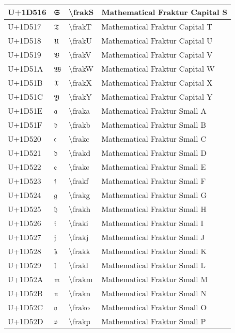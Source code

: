 \begin{table}[h]
\begin{tabulary}{\linewidth}{|L|L|L|L|}
\hline
U+1D516 & 𝔖 & {\textbackslash}frakS & Mathematical Fraktur Capital S \\
\hline
U+1D517 & 𝔗 & {\textbackslash}frakT & Mathematical Fraktur Capital T \\
\hline
U+1D518 & 𝔘 & {\textbackslash}frakU & Mathematical Fraktur Capital U \\
\hline
U+1D519 & 𝔙 & {\textbackslash}frakV & Mathematical Fraktur Capital V \\
\hline
U+1D51A & 𝔚 & {\textbackslash}frakW & Mathematical Fraktur Capital W \\
\hline
U+1D51B & 𝔛 & {\textbackslash}frakX & Mathematical Fraktur Capital X \\
\hline
U+1D51C & 𝔜 & {\textbackslash}frakY & Mathematical Fraktur Capital Y \\
\hline
U+1D51E & 𝔞 & {\textbackslash}fraka & Mathematical Fraktur Small A \\
\hline
U+1D51F & 𝔟 & {\textbackslash}frakb & Mathematical Fraktur Small B \\
\hline
U+1D520 & 𝔠 & {\textbackslash}frakc & Mathematical Fraktur Small C \\
\hline
U+1D521 & 𝔡 & {\textbackslash}frakd & Mathematical Fraktur Small D \\
\hline
U+1D522 & 𝔢 & {\textbackslash}frake & Mathematical Fraktur Small E \\
\hline
U+1D523 & 𝔣 & {\textbackslash}frakf & Mathematical Fraktur Small F \\
\hline
U+1D524 & 𝔤 & {\textbackslash}frakg & Mathematical Fraktur Small G \\
\hline
U+1D525 & 𝔥 & {\textbackslash}frakh & Mathematical Fraktur Small H \\
\hline
U+1D526 & 𝔦 & {\textbackslash}fraki & Mathematical Fraktur Small I \\
\hline
U+1D527 & 𝔧 & {\textbackslash}frakj & Mathematical Fraktur Small J \\
\hline
U+1D528 & 𝔨 & {\textbackslash}frakk & Mathematical Fraktur Small K \\
\hline
U+1D529 & 𝔩 & {\textbackslash}frakl & Mathematical Fraktur Small L \\
\hline
U+1D52A & 𝔪 & {\textbackslash}frakm & Mathematical Fraktur Small M \\
\hline
U+1D52B & 𝔫 & {\textbackslash}frakn & Mathematical Fraktur Small N \\
\hline
U+1D52C & 𝔬 & {\textbackslash}frako & Mathematical Fraktur Small O \\
\hline
U+1D52D & 𝔭 & {\textbackslash}frakp & Mathematical Fraktur Small P \\

\end{tabulary}
\end{table}
